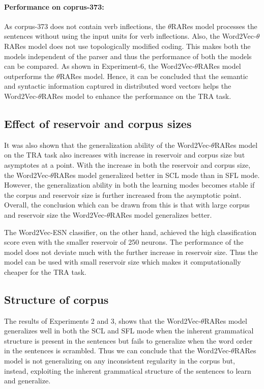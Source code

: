 \paragraph{Performance on coprus-373:} As corpus-373 does not contain verb inflections, the $\theta$RARes model processes the sentences without using the input units for verb inflections. Also, the Word2Vec-$\theta$RARes model does not use topologically modified coding. This makes both the models independent of the parser and thus the performance of both the models can be compared. As shown in Experiment-6, the Word2Vec-$\theta$RARes model outperforms the $\theta$RARes model. Hence, it can be concluded that the semantic and syntactic information captured in distributed word vectors helps the Word2Vec-$\theta$RARes model to enhance the performance on the TRA task.

\subsection{Effect of reservoir and corpus sizes}

It was also shown that the generalization ability of the Word2Vec-$\theta$RARes model on the TRA task also increases with increase in reservoir and corpus size but asymptotes at a point. With the increase in both the reservoir and corpus size, the Word2Vec-$\theta$RARes model generalized better in SCL mode than in SFL mode. However, the generalization ability in both the learning modes becomes stable if the corpus and reservoir size is further increased from the asymptotic point. Overall, the conclusion which can be drawn from this is that with large corpus and reservoir size the Word2Vec-$\theta$RARes model generalizes better.

The Word2Vec-ESN classifier, on the other hand, achieved the high classification score even with the smaller reservoir of 250 neurons. The performance of the model does not deviate much with the further increase in reservoir size. Thus the model can be used with small reservoir size which makes it computationally cheaper for the TRA task.

\subsection{Structure of corpus}

The results of Experiments 2 and 3, shows that the Word2Vec-$\theta$RARes model generalizes well in both the SCL and SFL mode when the inherent grammatical structure is present in the sentences but fails to generalize when the word order in the sentences is scrambled. Thus we can conclude that the Word2Vec-$\theta$RARes model is not generalizing on any inconsistent regularity in the corpus but, instead, exploiting the inherent grammatical structure of the sentences to learn and generalize.

